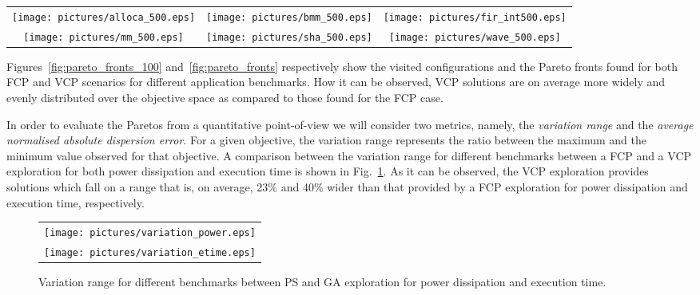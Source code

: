 \begin{itemize}
\begin{table*}
  \centering
  \begin{tabular}{ccc}
    \texttt{[image: pictures/alloca\_500.eps]} &
    \texttt{[image: pictures/bmm\_500.eps]} & 
    \texttt{[image: pictures/fir\_int500.eps]} \\
    \texttt{[image: pictures/mm\_500.eps]} &
    \texttt{[image: pictures/sha\_500.eps]} &
    \texttt{[image: pictures/wave\_500.eps]} 
  \end{tabular}
  \caption{Pareto fronts found by PS and GA for a fixed budget of 500 configurations.}
  \label{fig:pareto_fronts_100}
\end{table*}
Figures~\ref{fig:pareto_fronts_100} and~\ref{fig:pareto_fronts}
respectively show the visited configurations and the
Pareto fronts found for both FCP and VCP scenarios for different
application benchmarks. How it can be observed, VCP solutions
are on average  more widely and evenly distributed over the objective
space as compared to those found for the FCP case.




In order to evaluate the Paretos from a quantitative point-of-view we
will consider two metrics, namely, the \emph{variation range} and the
\emph{average normalised absolute dispersion error}. For a given
objective, the variation range represents the ratio between the
maximum and the minimum value observed for that objective. A
comparison between the variation range for different benchmarks
between a FCP and a VCP exploration for both power dissipation and
execution time is shown in Fig.~\ref{fig:variation_range}. As it can
be observed, the VCP exploration provides solutions which fall on a
range that is, on average, 23\% and 40\% wider than that provided by a
FCP exploration for power dissipation and execution time,
respectively.
\begin{figure}
  \centering
  \begin{tabular}{c}
    \texttt{[image: pictures/variation\_power.eps]} \\
    \texttt{[image: pictures/variation\_etime.eps]}
  \end{tabular}
  \caption{Variation range for different benchmarks between PS and GA
  exploration for power dissipation and execution time.}
  \label{fig:variation_range}
\end{figure}



\end{itemize}
